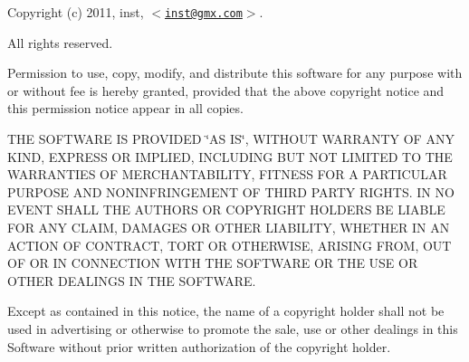 Copyright (c) 2011, inst, $<$\href{mailto:inst@gmx.com}{\tt inst@gmx.com}$>$.

All rights reserved.

Permission to use, copy, modify, and distribute this software for any purpose with or without fee is hereby granted, provided that the above copyright notice and this permission notice appear in all copies.

THE SOFTWARE IS PROVIDED \char`\"{}AS IS\char`\"{}, WITHOUT WARRANTY OF ANY KIND, EXPRESS OR IMPLIED, INCLUDING BUT NOT LIMITED TO THE WARRANTIES OF MERCHANTABILITY, FITNESS FOR A PARTICULAR PURPOSE AND NONINFRINGEMENT OF THIRD PARTY RIGHTS. IN NO EVENT SHALL THE AUTHORS OR COPYRIGHT HOLDERS BE LIABLE FOR ANY CLAIM, DAMAGES OR OTHER LIABILITY, WHETHER IN AN ACTION OF CONTRACT, TORT OR OTHERWISE, ARISING FROM, OUT OF OR IN CONNECTION WITH THE SOFTWARE OR THE USE OR OTHER DEALINGS IN THE SOFTWARE.

Except as contained in this notice, the name of a copyright holder shall not be used in advertising or otherwise to promote the sale, use or other dealings in this Software without prior written authorization of the copyright holder. 